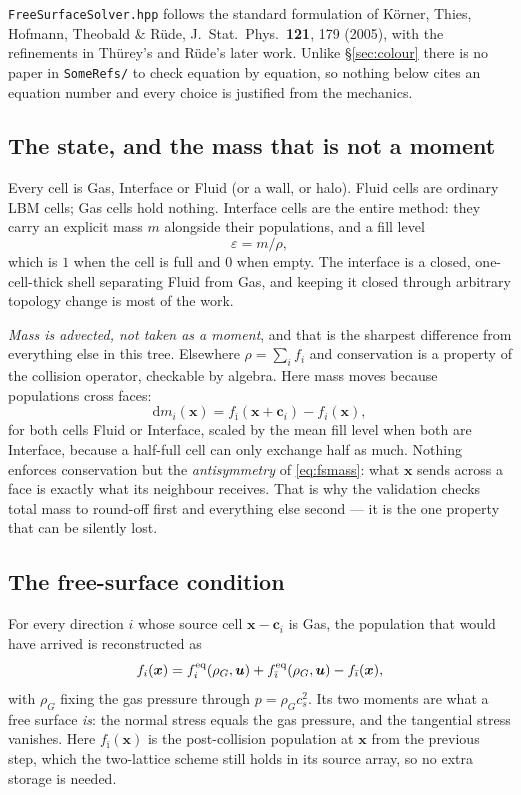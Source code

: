 \documentclass[11pt,a4paper]{article}
\newcommand{\code}[1]{\texttt{\small #1}}
\newcommand{\cs}{c_s}
\newcommand{\ci}{\bm{c}_i}
\newcommand{\uu}{\bm{u}}
\newcommand{\xx}{\bm{x}}
\begin{document}
\code{FreeSurfaceSolver.hpp} follows the standard formulation of K\"orner,
Thies, Hofmann, Theobald \& R\"ude, J.\ Stat.\ Phys.\ \textbf{121}, 179 (2005),
with the refinements in Th\"urey's and R\"ude's later work. Unlike
\S\ref{sec:colour} there is no paper in \code{SomeRefs/} to check equation by
equation, so nothing below cites an equation number and every choice is
justified from the mechanics.

\subsection{The state, and the mass that is not a moment}

Every cell is Gas, Interface or Fluid (or a wall, or halo). Fluid cells are
ordinary LBM cells; Gas cells hold nothing. Interface cells are the entire
method: they carry an explicit mass $m$ alongside their populations, and a fill
level
\begin{equation}
  \varepsilon = m / \rho,
\end{equation}
which is $1$ when the cell is full and $0$ when empty. The interface is a
closed, one-cell-thick shell separating Fluid from Gas, and keeping it closed
through arbitrary topology change is most of the work.

\emph{Mass is advected, not taken as a moment}, and that is the sharpest
difference from everything else in this tree. Elsewhere $\rho = \sum_i f_i$ and
conservation is a property of the collision operator, checkable by algebra. Here
mass moves because populations cross faces:
\begin{equation}
  \mathrm{d}m_i(\xx) = f_{\bar\imath}(\xx + \ci) - f_i(\xx),
  \label{eq:fsmass}
\end{equation}
for both cells Fluid or Interface, scaled by the mean fill level when both are
Interface, because a half-full cell can only exchange half as much. Nothing
enforces conservation but the \emph{antisymmetry} of \eqref{eq:fsmass}: what
$\xx$ sends across a face is exactly what its neighbour receives. That is why
the validation checks total mass to round-off first and everything else second
--- it is the one property that can be silently lost.

\subsection{The free-surface condition}

For every direction $i$ whose source cell $\xx - \ci$ is Gas, the population
that would have arrived is reconstructed as
\begin{equation}
  f_i(\xx) = f_i^{\rm eq}(\rho_G, \uu) + f_{\bar\imath}^{\rm eq}(\rho_G, \uu)
             - f_{\bar\imath}(\xx),
\end{equation}
with $\rho_G$ fixing the gas pressure through $p = \rho_G \cs^2$. Its two
moments are what a free surface \emph{is}: the normal stress equals the gas
pressure, and the tangential stress vanishes. Here $f_{\bar\imath}(\xx)$ is the
post-collision population at $\xx$ from the previous step, which the two-lattice
scheme still holds in its source array, so no extra storage is needed.
\end{document}
